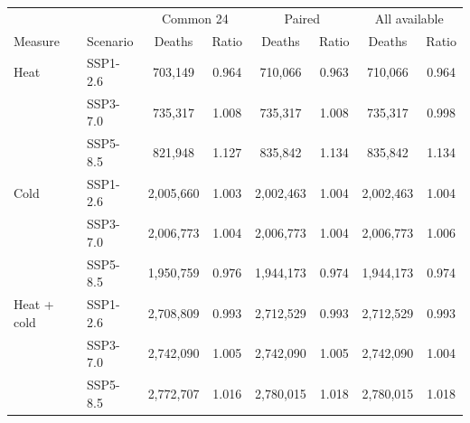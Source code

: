 \begin{tabular}{llcccccc}
\toprule
& & \multicolumn{2}{c}{Common 24} & \multicolumn{2}{c}{Paired} & \multicolumn{2}{c}{All available} \\ Measure & Scenario & Deaths & Ratio & Deaths & Ratio & Deaths & Ratio \\
\midrule
Heat & SSP1-2.6 & 703,149 & 0.964 & 710,066 & 0.963 & 710,066 & 0.964 \\
 & SSP3-7.0 & 735,317 & 1.008 & 735,317 & 1.008 & 735,317 & 0.998 \\
 & SSP5-8.5 & 821,948 & 1.127 & 835,842 & 1.134 & 835,842 & 1.134 \\
Cold & SSP1-2.6 & 2,005,660 & 1.003 & 2,002,463 & 1.004 & 2,002,463 & 1.004 \\
 & SSP3-7.0 & 2,006,773 & 1.004 & 2,006,773 & 1.004 & 2,006,773 & 1.006 \\
 & SSP5-8.5 & 1,950,759 & 0.976 & 1,944,173 & 0.974 & 1,944,173 & 0.974 \\
Heat + cold & SSP1-2.6 & 2,708,809 & 0.993 & 2,712,529 & 0.993 & 2,712,529 & 0.993 \\
 & SSP3-7.0 & 2,742,090 & 1.005 & 2,742,090 & 1.005 & 2,742,090 & 1.004 \\
 & SSP5-8.5 & 2,772,707 & 1.016 & 2,780,015 & 1.018 & 2,780,015 & 1.018 \\
\bottomrule
\end{tabular}
